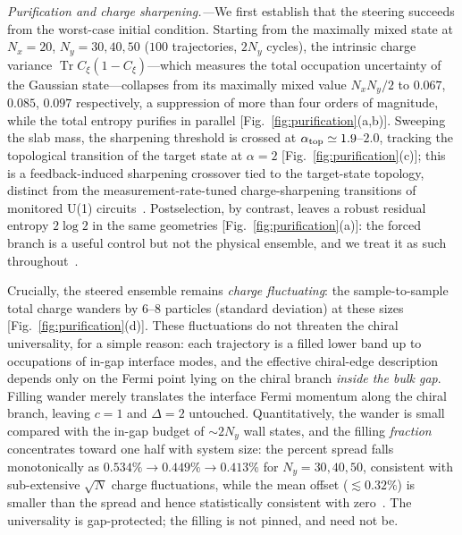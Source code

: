 \documentclass[aps,prl,twocolumn,floatfix,superscriptaddress,nofootinbib]{revtex4-2}
\newcommand{\Tr}{\operatorname{Tr}}
\newcommand{\atopo}{\alpha_{\rm top}}
\begin{document}
\emph{Purification and charge sharpening.---}We first establish that the steering succeeds from the worst-case initial condition.  Starting from the maximally mixed state at $N_x=20$, $N_y=30,40,50$ ($100$ trajectories, $2N_y$ cycles), the intrinsic charge variance $\Tr C_\xi(1-C_\xi)$---which measures the total occupation uncertainty of the Gaussian state---collapses from its maximally mixed value $N_xN_y/2$ to $0.067$, $0.085$, $0.097$ respectively, a suppression of more than four orders of magnitude, while the total entropy purifies in parallel [Fig.~\ref{fig:purification}(a,b)].  Sweeping the slab mass, the sharpening threshold is crossed at $\atopo\simeq1.9$--$2.0$, tracking the topological transition of the target state at $\alpha=2$ [Fig.~\ref{fig:purification}(c)]; this is a feedback-induced sharpening crossover tied to the target-state topology, distinct from the measurement-rate-tuned charge-sharpening transitions of monitored U(1) circuits~\cite{Agrawal2022,Barratt2022}.  Postselection, by contrast, leaves a robust residual entropy $2\log2$ in the same geometries [Fig.~\ref{fig:purification}(a)]: the forced branch is a useful control but not the physical ensemble, and we treat it as such throughout~\cite{SM}.

Crucially, the steered ensemble remains \emph{charge fluctuating}: the sample-to-sample total charge wanders by $6$--$8$ particles (standard deviation) at these sizes [Fig.~\ref{fig:purification}(d)].  These fluctuations do not threaten the chiral universality, for a simple reason: each trajectory is a filled lower band up to occupations of in-gap interface modes, and the effective chiral-edge description depends only on the Fermi point lying on the chiral branch \emph{inside the bulk gap}.  Filling wander merely translates the interface Fermi momentum along the chiral branch, leaving $c=1$ and $\Delta=2$ untouched.  Quantitatively, the wander is small compared with the in-gap budget of ${\sim}2N_y$ wall states, and the filling \emph{fraction} concentrates toward one half with system size: the percent spread falls monotonically as $0.534\%\to0.449\%\to0.413\%$ for $N_y=30,40,50$, consistent with sub-extensive $\sqrt{N}$ charge fluctuations, while the mean offset ($\lesssim0.32\%$) is smaller than the spread and hence statistically consistent with zero~\cite{SM}.  The universality is gap-protected; the filling is not pinned, and need not be.
\end{document}
